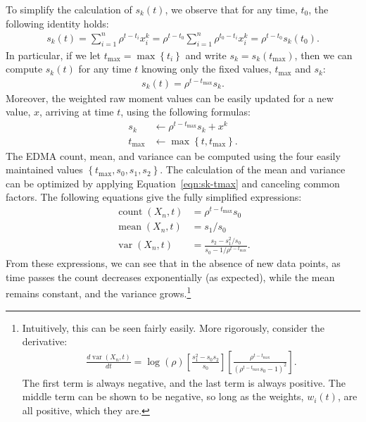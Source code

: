 \documentclass{article}
\DeclareMathOperator{\cnt}{count}
\DeclareMathOperator{\mean}{mean}
\DeclareMathOperator{\var}{var}
\newcommand{\tmax}{{t_\text{max}}}
\begin{document}
To simplify the calculation of $s_k(t)$, we observe that for any time, $t_0$, the following identity holds:
\begin{align}
s_k(t)
= \sum_{i=1}^{n}{\rho^{t-t_i} x_i^k}
= \rho^{t-t_0} \sum_{i=1}^{n}{\rho^{t_0-t_i} x_i^k} 
= \rho^{t-t_0} s_k(t_0).
\end{align}
In particular, if we let $\tmax=\max\left\{t_i\right\}$ and write $s_k=s_k(\tmax)$, then we can compute $s_k(t)$ for any time $t$ knowing only the fixed values, $\tmax$ and $s_k$:
\begin{align}
\label{eqn:sk-tmax}
s_k(t) = \rho^{t-\tmax} s_k.
\end{align}
Moreover, the weighted raw moment values can be easily updated for a new value, $x$, arriving at time $t$, using the following formulas:
\begin{align}
s_k &\leftarrow \rho^{t-\tmax} s_k + x^k \\
\tmax &\leftarrow \max\left\{t,\tmax\right\}.
\end{align}
The EDMA count, mean, and variance can be computed using the four easily maintained values $\left\{\tmax,s_0,s_1,s_2\right\}$. The calculation of the mean and variance can be optimized by applying Equation~\ref{eqn:sk-tmax} and canceling common factors. The following equations give the fully simplified expressions:
\begin{align}
\cnt(X_n,t) &= \rho^{t-\tmax} s_0 \\
\mean(X_n,t) &= s_1/s_0 \\
\var(X_n,t) &= \frac{s_2 - s_1^2/s_0}{s_0-1/\rho^{t-\tmax}}.
\end{align}
From these expressions, we can see that in the absence of new data points, as time passes the count decreases exponentially (as expected), while the mean remains constant, and the variance grows.\footnote{Intuitively, this can be seen fairly easily. More rigorously, consider the derivative:
\begin{align}
\frac{d \var(X_n,t)}{d t} =
	\log(\rho)
	\left[ \frac{s_1^2 - s_0 s_2}{s_0} \right]
	\left[ \frac{\rho^{t-\tmax}}{(\rho^{t-\tmax} s_0 - 1)^2} \right].
\end{align}
The first term is always negative, and the last term is always positive. The middle term can be shown to be negative, so long as the weights, $w_i(t)$, are all positive, which they are.
}
\end{document}
